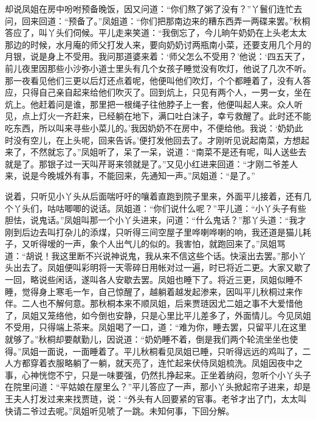 \begin{parag}
    却说凤姐在房中吩咐预备晚饭，因又问道：“你们熬了粥了没有？”丫鬟们连忙去问，回来回道：“预备了。”凤姐道：“你们把那南边来的糟东西弄一两碟来罢。”秋桐答应了，叫丫头们伺候。平儿走来笑道：“我倒忘了，今儿晌午奶奶在上头老太太那边的时候，水月庵的师父打发人来，要向奶奶讨两瓶南小菜，还要支用几个月的月银，说是身上不受用。我问那道婆来着：‘师父怎么不受用？’他说：‘四五天了，前儿夜里因那些小沙弥小道士里头有几个女孩子睡觉没有吹灯，他说了几次不听。那一夜看见他们三更以后灯还点着呢，他便叫他们吹灯，个个都睡着了，没有人答应，只得自己亲自起来给他们吹灭了。回到炕上，只见有两个人，一男一女，坐在炕上。他赶着问是谁，那里把一根绳子往他脖子上一套，他便叫起人来。众人听见，点上灯火一齐赶来，已经躺在地下，满口吐白沫子，幸亏救醒了。此时还不能吃东西，所以叫来寻些小菜儿的。’我因奶奶不在房中，不便给他。我说：‘奶奶此时没有空儿，在上头呢，回来告诉。’便打发他回去了。才刚听见说起南菜，方想起来了，不然就忘了。”凤姐听了，呆了一呆，说道：“南菜不是还有呢，叫人送些去就是了。那银子过一天叫芹哥来领就是了。”又见小红进来回道：“才刚二爷差人来，说是今晚城外有事，不能回来，先通知一声。”凤姐道：“是了。”
\end{parag}


\begin{parag}
    说着，只听见小丫头从后面喘吁吁的嚷着直跑到院子里来，外面平儿接着，还有几个丫头们，咕咕唧唧的说话。凤姐道：“你们说什么呢？”平儿道：“小丫头子有些胆怯，说鬼话。”凤姐叫那一个小丫头进来，问道：“什么鬼话？”那丫头道：“我才刚到后边去叫打杂儿的添煤，只听得三间空屋子里哗喇哗喇的响，我还道是猫儿耗子，又听得嗳的一声，象个人出气儿的似的。我害怕，就跑回来了。”凤姐骂道：“胡说！我这里断不兴说神说鬼，我从来不信这些个话。快滚出去罢。”那小丫头出去了。凤姐便叫彩明将一天零碎日用帐对过一遍，时已将近二更。大家又歇了一回，略说些闲话，遂叫各人安歇去罢。凤姐也睡下了。将近三更，凤姐似睡不睡，觉得身上寒毛一乍，自己惊醒了，越躺着越发起渗来，因叫平儿秋桐过来作伴。二人也不解何意。那秋桐本来不顺凤姐，后来贾琏因尤二姐之事不大爱惜他了，凤姐又笼络他，如今倒也安静，只是心里比平儿差多了，外面情儿。今见凤姐不受用，只得端上茶来。凤姐喝了一口，道：“难为你，睡去罢，只留平儿在这里就够了。”秋桐却要献勤儿，因说道：“奶奶睡不着，倒是我们两个轮流坐坐也使得。”凤姐一面说，一面睡着了。平儿秋桐看见凤姐已睡，只听得远远的鸡叫了，二人方都穿着衣服略躺了一躺，就天亮了，连忙起来伏侍凤姐梳洗。凤姐因夜中之事，心神恍惚不宁，只是一味要强，仍然扎挣起来。正坐着纳闷，忽听个小丫头子在院里问道：“平姑娘在屋里么？”平儿答应了一声，那小丫头掀起帘子进来，却是王夫人打发过来来找贾琏，说：“外头有人回要紧的官事。老爷才出了门，太太叫快请二爷过去呢。”凤姐听见唬了一跳。未知何事，下回分解。
\end{parag}